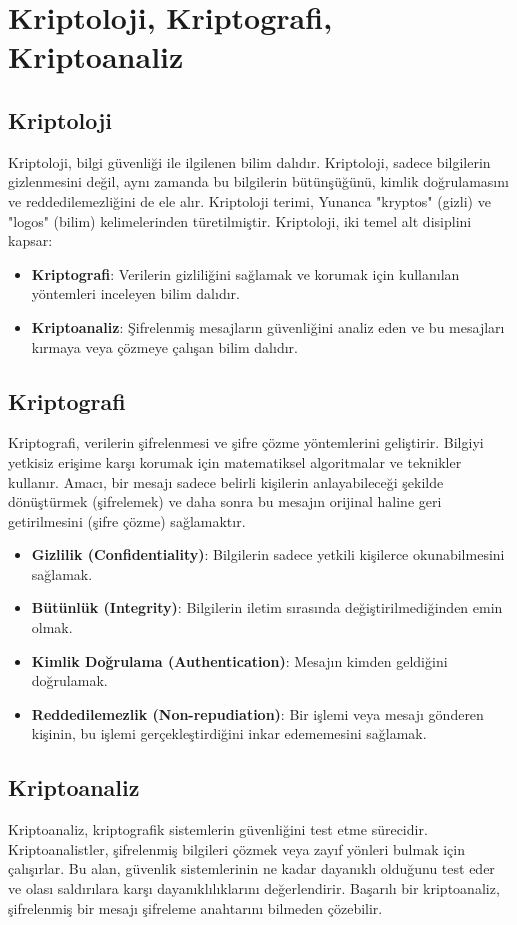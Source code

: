 \section{Kriptoloji, Kriptografi, Kriptoanaliz}

\subsection{Kriptoloji}

Kriptoloji, bilgi güvenliği ile ilgilenen bilim dalıdır. Kriptoloji, sadece bilgilerin gizlenmesini değil, aynı zamanda bu bilgilerin bütünşüğünü, kimlik doğrulamasını ve reddedilemezliğini de ele alır. Kriptoloji terimi, Yunanca "kryptos" (gizli) ve "logos" (bilim) kelimelerinden türetilmiştir. Kriptoloji, iki temel alt disiplini kapsar:

\begin{itemize}
    \item \textbf{Kriptografi}: Verilerin gizliliğini sağlamak ve korumak için kullanılan yöntemleri inceleyen bilim dalıdır.
    \item \textbf{Kriptoanaliz}: Şifrelenmiş mesajların güvenliğini analiz eden ve bu mesajları kırmaya veya çözmeye çalışan bilim dalıdır.
\end{itemize}

\subsection{Kriptografi}

Kriptografi, verilerin şifrelenmesi ve şifre çözme yöntemlerini geliştirir. Bilgiyi yetkisiz erişime karşı korumak için matematiksel algoritmalar ve teknikler kullanır. Amacı, bir mesajı sadece belirli kişilerin anlayabileceği şekilde dönüştürmek (şifrelemek) ve daha sonra bu mesajın orijinal haline geri getirilmesini (şifre çözme) sağlamaktır.

\begin{itemize}
    \item \textbf{Gizlilik (Confidentiality)}: Bilgilerin sadece yetkili kişilerce okunabilmesini sağlamak.
    \item \textbf{Bütünlük (Integrity)}: Bilgilerin iletim sırasında değiştirilmediğinden emin olmak.
    \item \textbf{Kimlik Doğrulama (Authentication)}: Mesajın kimden geldiğini doğrulamak.
    \item \textbf{Reddedilemezlik (Non-repudiation)}: Bir işlemi veya mesajı gönderen kişinin, bu işlemi gerçekleştirdiğini inkar edememesini sağlamak.
\end{itemize}

\subsection{Kriptoanaliz}

Kriptoanaliz, kriptografik sistemlerin güvenliğini test etme sürecidir. Kriptoanalistler, şifrelenmiş bilgileri çözmek veya zayıf yönleri bulmak için çalışırlar. Bu alan, güvenlik sistemlerinin ne kadar dayanıklı olduğunu test eder ve olası saldırılara karşı dayanıklılıklarını değerlendirir. Başarılı bir kriptoanaliz, şifrelenmiş bir mesajı şifreleme anahtarını bilmeden çözebilir.

\newpage